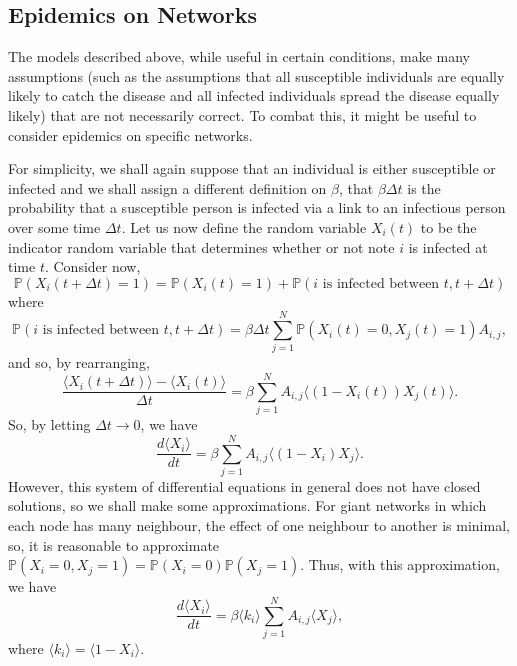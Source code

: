 \documentclass[
]{article}
\theoremstyle{definition}
\begin{document}
\hypertarget{epidemics-on-networks}{%
\subsection{Epidemics on Networks}\label{epidemics-on-networks}}

The models described above, while useful in certain conditions, make
many assumptions (such as the assumptions that all susceptible
individuals are equally likely to catch the disease and all infected
individuals spread the disease equally likely) that are not necessarily
correct. To combat this, it might be useful to consider epidemics on
specific networks.

For simplicity, we shall again suppose that an individual is either
susceptible or infected and we shall assign a different definition on
\(\beta\), that \(\beta \Delta t\) is the probability that a susceptible
person is infected via a link to an infectious person over some time
\(\Delta t\). Let us now define the random variable \(X_i(t)\) to be the
indicator random variable that determines whether or not note \(i\) is
infected at time \(t\). Consider now,
\[\mathbb{P}(X_i(t + \Delta t) = 1) = \mathbb{P}(X_i(t) = 1) + 
  \mathbb{P}(i \text{ is infected between } t, t + \Delta t)\] where
\[\mathbb{P}(i \text{ is infected between } t, t + \Delta t) = 
  \beta \Delta t \sum_{j = 1}^N \mathbb{P}(X_i(t) = 0, X_j(t) = 1) A_{i, j},\]
and so, by rearranging,
\[\frac{\langle X_i(t + \Delta t) \rangle - \langle X_i(t) \rangle}{\Delta t} = 
  \beta \sum_{j = 1}^N A_{i, j} \langle (1 - X_i(t))X_j(t) \rangle.\]
So, by letting \(\Delta t \to 0\), we have
\[\frac{d\langle X_i \rangle}{dt} = 
  \beta \sum_{j = 1}^N A_{i, j}\langle (1 - X_i)X_j \rangle.\] However,
this system of differential equations in general does not have closed
solutions, so we shall make some approximations. For giant networks in
which each node has many neighbour, the effect of one neighbour to
another is minimal, so, it is reasonable to approximate
\(\mathbb{P}(X_i = 0, X_j = 1) = \mathbb{P}(X_i = 0)\mathbb{P}(X_j = 1)\).
Thus, with this approximation, we have
\[\frac{d\langle X_i \rangle}{dt} = 
  \beta \langle k_i \rangle \sum_{j = 1}^N A_{i, j}\langle X_j \rangle,\]
where \(\langle k_i \rangle = \langle 1 - X_i \rangle\).
\end{document}
